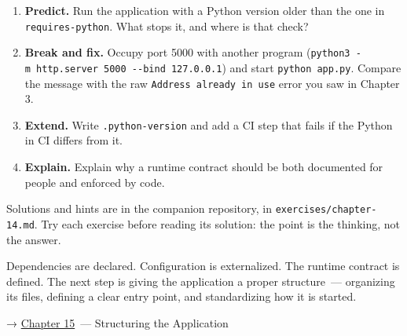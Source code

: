 \begin{enumerate}
\def\labelenumi{\arabic{enumi}.}
\tightlist
\item
  \textbf{Predict.} Run the application with a Python version older than the one in \texttt{requires-python}. What stops it, and where is that check?
\item
  \textbf{Break and fix.} Occupy port 5000 with another program (\texttt{python3\ -}\allowbreak{}\texttt{m\ http.}\allowbreak{}\texttt{server\ 5000\ -}\allowbreak{}\texttt{-}\allowbreak{}\texttt{bind\ 127.}\allowbreak{}\texttt{0.}\allowbreak{}\texttt{0.}\allowbreak{}\texttt{1}) and start \texttt{python\ app.py}. Compare the message with the raw \texttt{Address\ already\ in\ use} error you saw in Chapter 3.
\item
  \textbf{Extend.} Write \texttt{.python-version} and add a CI step that fails if the Python in CI differs from it.
\item
  \textbf{Explain.} Explain why a runtime contract should be both documented for people and enforced by code.
\end{enumerate}

\noindent{}Solutions and hints are in the companion repository, in \texttt{exercises/}\allowbreak{}\texttt{chapter-14.md}. Try each exercise before reading its solution: the point is the thinking, not the answer.

\label{14-runtime-contract:whats-next}

Dependencies are declared. Configuration is externalized. The runtime contract is defined. The next step is giving the application a proper structure~--- organizing its files, defining a clear entry point, and standardizing how it is started.

\noindent{}→ \hyperref[ch:15-structuring-the-application]{Chapter 15}~--- Structuring the Application
